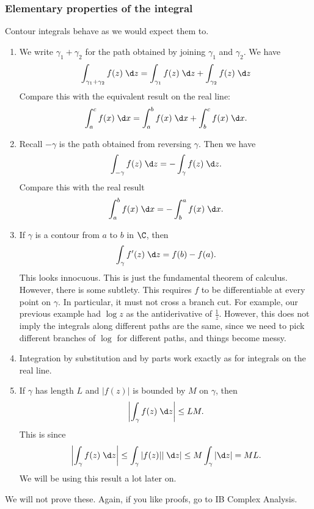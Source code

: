 \documentclass[a4paper]{article}
\begin{document}
\subsubsection*{Elementary properties of the integral}
Contour integrals behave as we would expect them to.
\begin{prop}\leavevmode
  \begin{enumerate}
    \item We write $\gamma_1 + \gamma_2$ for the path obtained by joining $\gamma_1$ and $\gamma_2$. We have
      \[
        \int_{\gamma_1 + \gamma_2} f(z)\;\d z = \int_{\gamma_1} f(z)\;\d z + \int_{\gamma_2} f(z)\;\d z\\
      \]
      Compare this with the equivalent result on the real line:
      \[
        \int_a^c f(x)\;\d x = \int_a^b f(x)\;\d x + \int_b^c f(x)\;\d x.
      \]
    \item Recall $-\gamma$ is the path obtained from reversing $\gamma$. Then we have
      \[
        \int_{-\gamma} f(z)\;\d z = -\int_\gamma f(z)\;\d z.
      \]
      Compare this with the real result
      \[
        \int_a^b f(x)\;\d x = -\int_b^a f(x)\;\d x.
      \]
    \item If $\gamma$ is a contour from $a$ to $b$ in $\C$, then
      \[
        \int_\gamma f'(z)\;\d z = f(b) - f(a).
      \]
      This looks innocuous. This is just the fundamental theorem of calculus. However, there is some subtlety. This requires $f$ to be differentiable at every point on $\gamma$. In particular, it must not cross a branch cut. For example, our previous example had $\log z$ as the antiderivative of $\frac{1}{z}$. However, this does not imply the integrals along different paths are the same, since we need to pick different branches of $\log$ for different paths, and things become messy.

    \item Integration by substitution and by parts work exactly as for integrals on the real line.
    \item If $\gamma$ has length $L$ and $|f(z)|$ is bounded by $M$ on $\gamma$, then
      \[
        \left|\int_\gamma f(z)\;\d z\right| \leq L M.
      \]
      This is since
      \[
        \left|\int_\gamma f(z)\;\d z\right| \leq \int_\gamma |f(z)| |\;\d z| \leq M \int_\gamma |\d z| = ML.
      \]
      We will be using this result a lot later on.
  \end{enumerate}
\end{prop}
We will not prove these. Again, if you like proofs, go to IB Complex Analysis.
\end{document}
